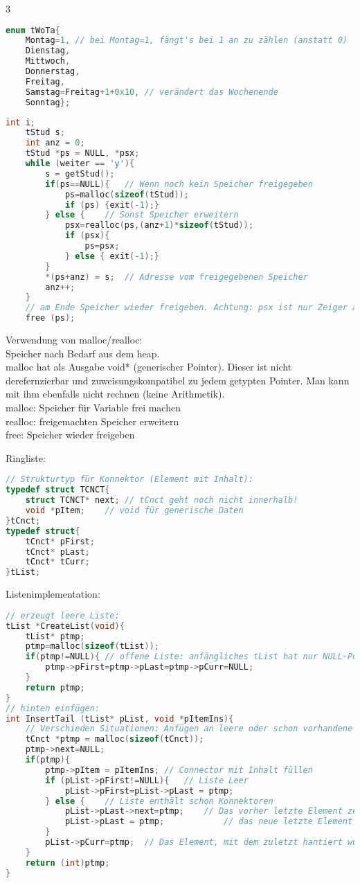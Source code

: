 \begin{multicols*}{3}

\begin{lstlisting}[language=C]
enum tWoTa{
	Montag=1, // bei Montag=1, fängt's bei 1 an zu zählen (anstatt 0)
	Dienstag, 
	Mittwoch, 
	Donnerstag,
	Freitag,
	Samstag=Freitag+1+0x10,	// verändert das Wochenende
	Sonntag};
\end{lstlisting}
\HRule[4pt]
\begin{lstlisting}[language=C]
	int i;
	tStud s;
	int anz = 0;
	tStud *ps = NULL, *psx;
	while (weiter == 'y'){
		s = getStud();
		if(ps==NULL){	// Wenn noch kein Speicher freigegeben
			ps=malloc(sizeof(tStud));	
			if (ps) {exit(-1);}
		} else {	// Sonst Speicher erweitern
			psx=realloc(ps,(anz+1)*sizeof(tStud));
			if (psx){
				ps=psx;
			} else { exit(-1);}
		}		
		*(ps+anz) = s;	// Adresse vom freigegebenen Speicher
		anz++;
	}
	// am Ende Speicher wieder freigeben. Achtung: psx ist nur Zeiger auf ps
	free (ps);
\end{lstlisting}
Verwendung von malloc/realloc:\\
Speicher nach Bedarf aus dem heap.\\
malloc hat als Ausgabe void* (generischer Pointer). Dieser ist nicht derefernzierbar und zuweisungskompatibel zu jedem getypten Pointer. Man kann mit ihm ebenfalls nicht rechnen (keine Arithmetik).\\
malloc: Speicher für Variable frei machen\\
realloc: freigemachten Speicher erweitern\\
free: Speicher wieder freigeben
\HRule[4pt]

Ringliste:
\begin{lstlisting}[language=C]
// Strukturtyp für Konnektor (Element mit Inhalt):
typedef struct TCNCT{
	struct TCNCT* next;	// tCnct geht noch nicht innerhalb!
	void *pItem;	// void für generische Daten
}tCnct;
typedef struct{
	tCnct* pFirst;
	tCnct* pLast;
	tCnct* tCurr;
}tList;
\end{lstlisting}
Listenimplementation:
\begin{lstlisting}[language=C]
// erzeugt leere Liste:
tList *CreateList(void){
	tList* ptmp;
	ptmp=malloc(sizeof(tList));
	if(ptmp!=NULL){	// offene Liste: anfängliches tList hat nur NULL-Pointer
		ptmp->pFirst=ptmp->pLast=ptmp->pCurr=NULL;
	}
	return ptmp;
}
// hinten einfügen:
int InsertTail (tList* pList, void *pItemIns){
	// Verschieden Situationen: Anfügen an leere oder schon vorhandene Liste
	tCnct *ptmp = malloc(sizeof(tCnct));
	ptmp->next=NULL;
	if(ptmp){
		ptmp->pItem = pItemIns;	// Connector mit Inhalt füllen
		if (pList->pFirst!=NULL){	// Liste Leer
			pList->pFirst=pList->pLast = ptmp;
		} else {	// Liste enthält schon Konnektoren
			pList->pLast->next=ptmp;	// Das vorher letzte Element zeigt nun auf das eingefügte und damit neue letzte Element
			pList->pLast = ptmp;			// das neue letzte Element
		}
		pList->pCurr=ptmp;	// Das Element, mit dem zuletzt hantiert wurde ist pCurr
	}
	return (int)ptmp;
}
\end{lstlisting}


\end{multicols*}
